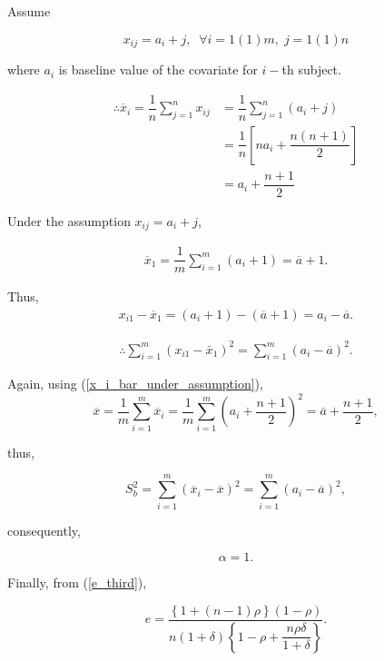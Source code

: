 \documentclass[11pt, a4paper]{article}
\begin{document}
\begin{itemize}
{\fontsize{12}{20} \gloriahallelujahfont Assume}

\begin{equation}\label{assumption}
x_{ij} = a_i + j, \;\; \forall i = 1(1)m, \; j = 1(1)n
\end{equation}

where $a_i$ is baseline value of the covariate for $i-$th subject.

\begin{align}\label{x_i_bar_under_assumption}
\therefore \overline{x}_i = \dfrac{1}{n} \sum\limits_{j=1}^{n} x_{ij} &= \dfrac{1}{n} \sum\limits_{j=1}^{n} (a_i + j) \nonumber \\[0.5em]
&= \dfrac{1}{n} \left[ n a_i + \dfrac{n(n+1)}{2}\right] \nonumber \\[0.5em]
&= a_i + \dfrac{n+1}{2}
\end{align}

\newpage

Under the assumption $x_{ij} = a_i + j$,

\begin{align*}
\overline{x}_1 = \dfrac{1}{m} \sum \limits_{i = 1}^{m} (a_i + 1) = \overline{a} + 1.
\end{align*}

Thus,
\begin{align*}
x_{i1} - \overline{x}_1 = (a_i + 1) - (\overline{a} + 1) = a_i - \overline{a}.
\end{align*}

\begin{align*}
\therefore \sum \limits_{i = 1}^{m} (x_{i1} - \bar{x}_1)^2 = \sum \limits_{i = 1}^{m} (a_i - \overline{a})^2.
\end{align*}

Again, using (\ref{x_i_bar_under_assumption}), $$\overline{x} = \dfrac{1}{m} \sum \limits_{i = 1}^{m} \overline{x}_i = \dfrac{1}{m} \sum \limits_{i = 1}^{m} \left( a_i + \dfrac{n+1}{2} \right)^2 = \overline{a} + \dfrac{n+1}{2},$$

thus,

$$S_b^2 = \sum \limits_{i = 1}^{m} (\overline{x}_{i} - \overline{x})^2 = \sum \limits_{i = 1}^{m} (a_i - \overline{a})^2,$$

consequently,

$$\alpha = 1.$$

Finally, from (\ref{e_third}),

$$e = \dfrac{\left\{1+(n-1)\rho\right\}(1-\rho)}{n(1+\delta)\left\{1 - \rho + \dfrac{n\rho\delta}{1+\delta}\right\}}.$$
\end{itemize}


\vspace{5em}

\begin{center}
\BlackRookOnBlack \BlackKnightOnWhite \BlackBishopOnBlack \BlackKingOnWhite \BlackQueenOnBlack \BlackBishopOnWhite \BlackKnightOnBlack \BlackRookOnWhite
\end{center}
\end{document}
